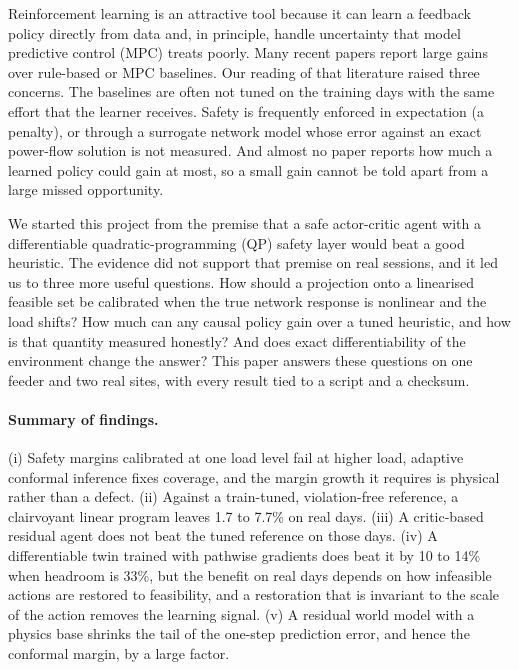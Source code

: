 \documentclass[11pt]{article}
\begin{document}
Reinforcement learning is an attractive tool because it can learn a feedback policy directly from data and, in principle, handle uncertainty that model predictive control (MPC) treats poorly. Many recent papers report large gains over rule-based or MPC baselines. Our reading of that literature raised three concerns. The baselines are often not tuned on the training days with the same effort that the learner receives. Safety is frequently enforced in expectation (a penalty), or through a surrogate network model whose error against an exact power-flow solution is not measured. And almost no paper reports how much a learned policy could gain at most, so a small gain cannot be told apart from a large missed opportunity.

We started this project from the premise that a safe actor-critic agent with a differentiable quadratic-programming (QP) safety layer would beat a good heuristic. The evidence did not support that premise on real sessions, and it led us to three more useful questions. How should a projection onto a linearised feasible set be calibrated when the true network response is nonlinear and the load shifts? How much can any causal policy gain over a tuned heuristic, and how is that quantity measured honestly? And does exact differentiability of the environment change the answer? This paper answers these questions on one feeder and two real sites, with every result tied to a script and a checksum.

\paragraph{Summary of findings.} (i) Safety margins calibrated at one load level fail at higher load, adaptive conformal inference fixes coverage, and the margin growth it requires is physical rather than a defect. (ii) Against a train-tuned, violation-free reference, a clairvoyant linear program leaves 1.7 to 7.7\% on real days. (iii) A critic-based residual agent does not beat the tuned reference on those days. (iv) A differentiable twin trained with pathwise gradients does beat it by 10 to 14\% when headroom is 33\%, but the benefit on real days depends on how infeasible actions are restored to feasibility, and a restoration that is invariant to the scale of the action removes the learning signal. (v) A residual world model with a physics base shrinks the tail of the one-step prediction error, and hence the conformal margin, by a large factor.

\end{document}
